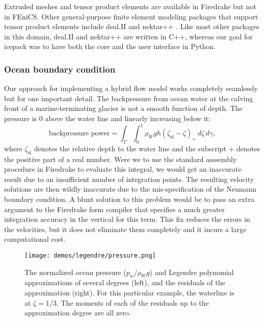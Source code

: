 \documentclass[journal abbreviation, manuscript]{copernicus}
\begin{document}
Extruded meshes and tensor product elements are available in Firedrake but not in FEniCS.
Other general-purpose finite element modeling packages that support tensor product elements include deal.II and nektar++ \citep{bangerth2007deal, cantwell2015nektar++}.
Like most other packages in this domain, deal.II and nektar++ are written in C++, whereas our goal for icepack was to have both the core and the user interface in Python.

\subsubsection{Ocean boundary condition}

Our approach for implementing a hybrid flow model works completely seamlessly but for one important detail.
The backpressure from ocean water at the calving front of a marine-terminating glacier is not a smooth function of depth.
The pressure is 0 above the water line and linearly increasing below it:
\begin{equation}
    \text{backpressure power} = \int_\Gamma\int_0^1 \rho_Wgh(\zeta_{\text{sl}} - \zeta)_+\,d\zeta\,d\gamma,
    \label{backpressure}
\end{equation}
where $\zeta_{\text{sl}}$ denotes the relative depth to the water line and the subscript $+$ denotes the positive part of a real number.
Were we to use the standard asssembly procedure in Firedrake to evaluate this integral, we would get an inaccurate result due to an insufficient number of integration points.
The resulting velocity solutions are then wildly inaccurate due to the mis-specification of the Neumann boundary condition.
A blunt solution to this problem would be to pass an extra argument to the Firedrake form compiler that specifies a much greater integration accuracy in the vertical for this term.
This fix reduces the errors in the velocities, but it does not eliminate them completely and it incurs a large computational cost.

\begin{figure}[h]
    \texttt{[image: demos/legendre/pressure.png]}
    \caption{The normalized ocean pressure ($p_w / \rho_Wg$) and Legendre polynomial approximations of several degrees (left), and the residuals of the approximation (right).
    For this particular example, the waterline is at $\zeta = 1/3$.
    The moments of each of the residuals up to the approximation degree are all zero.}
    \label{fig:legendre}
\end{figure}
\end{document}
